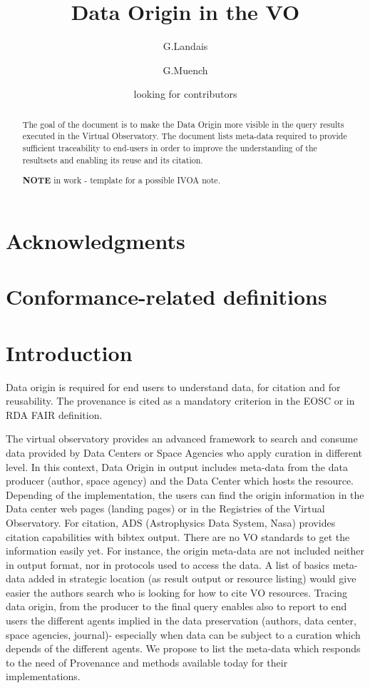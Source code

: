 \documentclass[11pt,a4paper]{ivoa}
\title{Data Origin in the VO}
\author{G.Landais}
\author{G.Muench}
\author{looking for contributors}
\begin{document}
\begin{abstract}
The goal of the document is to make the Data Origin more visible in the query results executed in the Virtual Observatory. 
The document lists meta-data required to provide sufficient traceability to end-users in order to improve the understanding 
of the resultsets and enabling its reuse and its citation.

\textbf{NOTE} in work -  template for a possible IVOA note.

\end{abstract}


\section*{Acknowledgments}


\section*{Conformance-related definitions}


\section{Introduction}

Data origin is required for end users to understand data, for citation and for reusability. The  provenance is cited as a mandatory criterion in the EOSC or in RDA FAIR definition. 

The virtual observatory provides an advanced framework to search and consume data provided by Data Centers or Space Agencies who apply curation in different level.  In this context, Data Origin in output includes meta-data from the data producer (author, space agency) and the Data Center which hosts the resource. 
Depending of the implementation, the users can find the origin information in the Data center web pages (landing pages) or in the Registries of the Virtual Observatory. For citation, ADS (Astrophysics Data System, Nasa) provides citation capabilities with bibtex output. There are no VO standards to get the information easily yet. For instance, the origin meta-data are not included neither in output format, nor in protocols used to access the data.
A list of basics meta-data added in strategic location (as result output or resource listing) would give easier the authors search who is looking for how to cite VO resources. Tracing data origin, from the producer to the final query enables also to report to end users the different agents implied in the data preservation (authors, data center, space agencies, journal)- especially when data can be subject to a curation  which depends of the different agents.
We propose to list the meta-data which responds to the need of Provenance and methods available today for their implementations. 
\end{document}
